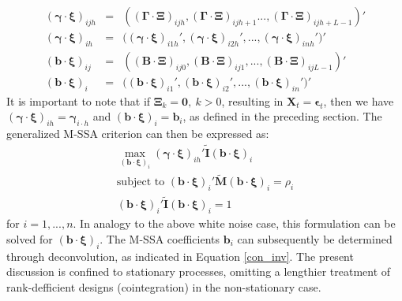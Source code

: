 \documentclass[11pt,a4paper]{article}
\begin{document}
\begin{eqnarray*}
(\boldsymbol{\gamma}\cdot\boldsymbol{\xi})_{ijh}&=&\left((\boldsymbol{\Gamma}\cdot\boldsymbol{\Xi})_{ijh},(\boldsymbol{\Gamma}\cdot\boldsymbol{\Xi})_{ ijh+1}...,(\boldsymbol{\Gamma}\cdot\boldsymbol{\Xi})_{ijh+L-1}\right)'\\
(\boldsymbol{\gamma}\cdot\boldsymbol{\xi})_{ih}&=&\Big((\boldsymbol{\gamma}\cdot\boldsymbol{\xi})_{i1h}',(\boldsymbol{\gamma}\cdot\boldsymbol{\xi})_{i2h}',...,(\boldsymbol{\gamma}\cdot\boldsymbol{\xi})_{inh}'\Big)'\\
(\mathbf{b}\cdot\boldsymbol{\xi})_{ij}&=&\left((\mathbf{B}\cdot\boldsymbol{\Xi})_{ ij0},(\mathbf{B}\cdot\boldsymbol{\Xi})_{ij1},...,(\mathbf{B}\cdot\boldsymbol{\Xi})_{ijL-1}\right)'\\
(\mathbf{b}\cdot\boldsymbol{\xi})_{i}&=&\Big((\mathbf{b}\cdot\boldsymbol{\xi})_{i1}',(\mathbf{b}\cdot\boldsymbol{\xi})_{i2}',...,(\mathbf{b}\cdot\boldsymbol{\xi})_{in}'\Big)'
\end{eqnarray*}
It is important to note that if $\boldsymbol{\Xi}_k=\mathbf{0},~k>0$, resulting in $\mathbf{X}_t=\boldsymbol{\epsilon}_t$, then we have $(\boldsymbol{\gamma}\cdot\boldsymbol{\xi})_{ih}=\boldsymbol{\gamma}_{i\cdot h}$ and $(\mathbf{b}\cdot\boldsymbol{\xi})_{i}=\mathbf{b}_i$, as defined in the preceding section. The generalized M-SSA criterion can then be expressed as: 
\begin{eqnarray}\label{gen_stat_x}
\max_{(\mathbf{b}\cdot\boldsymbol{\xi})_i} (\boldsymbol{\gamma}\cdot\boldsymbol{\xi})_{ih}'\mathbf{\tilde{I}} (\mathbf{b}\cdot\boldsymbol{\xi})_i\\
\textrm{subject~to~}(\mathbf{b}\cdot\boldsymbol{\xi})_i'\mathbf{\tilde{M}}(\mathbf{b}\cdot\boldsymbol{\xi})_i=\rho_i\nonumber\\
(\mathbf{b}\cdot\boldsymbol{\xi})_i'\mathbf{\tilde{I}}(\mathbf{b}\cdot\boldsymbol{\xi})_i=1\nonumber
\end{eqnarray}
for $i=1,...,n$. In analogy to the above white noise case, this formulation can be solved for $(\mathbf{b}\cdot\boldsymbol{\xi})_i$. The M-SSA coefficients $\mathbf{b}_i$ can subsequently be determined through deconvolution, as indicated in Equation \eqref{con_inv}. 
The present discussion is confined to stationary processes, omitting a lengthier treatment of rank-defficient designs (cointegration) in the non-stationary case.\\
\end{document}
